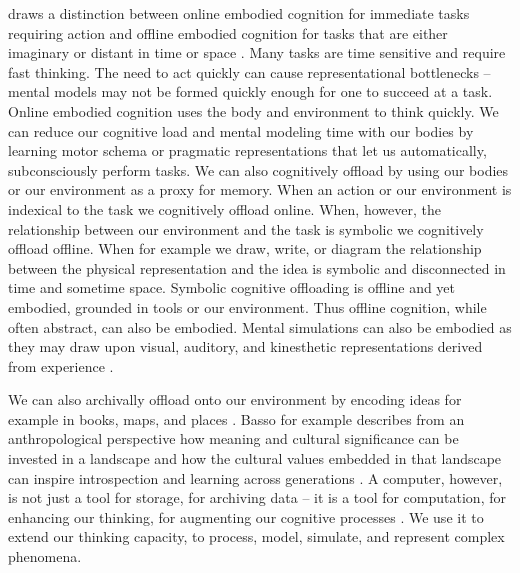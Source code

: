 \documentclass{article}
\begin{document}
\citeauthor{Wilson2002} draws a distinction between online embodied cognition for immediate tasks requiring action and offline embodied cognition for tasks that are either imaginary or distant in time or space \citeyearpar{Wilson2002}. 
Many tasks are time sensitive and require fast thinking. 
The need to act quickly can cause representational bottlenecks -- mental models may not be formed quickly enough for one to succeed at a task. 
Online embodied cognition uses the body and environment to think quickly. 
We can reduce our cognitive load and mental modeling time with our bodies by learning motor schema or pragmatic representations that let us automatically, subconsciously perform tasks. 
We can also cognitively offload by using our bodies or our environment as a proxy for memory. 
When an action or our environment is indexical to the task we cognitively offload online. 
When, however, the relationship between our environment and the task is symbolic we cognitively offload offline. 
When for example we draw, write, or diagram the relationship between the physical representation and the idea is symbolic and disconnected in time and sometime space. 
Symbolic cognitive offloading is offline and yet embodied, grounded in tools or our environment. 
Thus offline cognition, while often abstract, can also be embodied. 
Mental simulations can also be embodied as they may draw upon visual, auditory, and kinesthetic representations derived from experience \citep{Wilson2002}. 

We can also archivally offload onto our environment by encoding ideas for example in books, maps, and places \citep{Wilson2002}.
Basso for example describes from an anthropological perspective how meaning and cultural significance can be invested in a landscape and how the cultural values embedded in that landscape can inspire introspection and learning across generations \citeyearpar{Basso1996}. 
A computer, however, is not just a tool for storage, for archiving data -- it is a tool for computation, for enhancing our thinking, for augmenting our cognitive processes \citep{Dror2008}. 
We use it to extend our thinking capacity, to process, model, simulate, and represent complex phenomena. 


\end{document}
